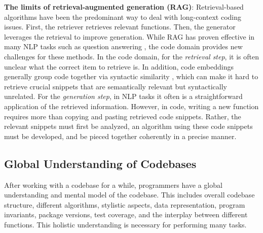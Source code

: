 \textbf{The limits of retrieval-augmented generation (RAG)}: Retrieval-based algorithms have been the predominant way to deal with long-context coding issues. First, the retriever retrieves relevant functions. Then, the generator leverages the retrieval to improve generation. While RAG has proven effective in many NLP tasks such as question answering \citep{gao2023retrieval, lewis2020retrieval}, the code domain provides new challenges for these methods. In the code domain, for the \textit{retrieval step}, it is often unclear what the correct item to retrieve is. In addition, code embeddings generally group code together via syntactic similarity \citep{ma2024unveiling, utpala2023language}, which can make it hard to retrieve crucial snippets that are semantically relevant but syntactically unrelated. For the \textit{generation step}, in NLP tasks it often is a straightforward application of the retrieved information. However, in code, writing a new function requires more than copying and pasting retrieved code snippets. Rather, the relevant snippets must first be analyzed, an algorithm using these code snippets must be developed, and be pieced together coherently in a precise manner.



\vspace{-0.25cm}

\subsection{Global Understanding of Codebases} \label{sec:c-global-understanding}

\vspace{-0.1cm}



After working with a codebase for a while, programmers have a global understanding and mental model of the codebase. This includes overall codebase structure, different algorithms, stylistic aspects, data representation, program invariants, package versions, test coverage, and the interplay between different functions. This holistic understanding is necessary for performing many tasks.

